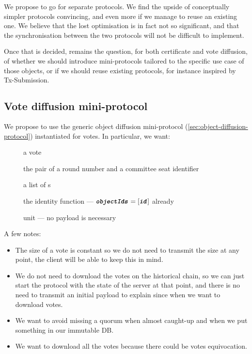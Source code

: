 We propose to go for separate protocols. We find the upside of conceptually
simpler protocols convincing, and even more if we manage to reuse an existing
one. We believe that the lost optimisation is in fact not so significant, and
that the synchronisation between the two protocols will not be difficult to
implement.

Once that is decided, remains the question, for both certificate and vote
diffusion, of whether we should introduce mini-protocols tailored to the
specific use case of those objects, or if we should reuse existing protocols,
for instance inspired by Tx-Submission.


\subsection{Vote diffusion mini-protocol}%
\label{sec:vote-diffusion}

We propose to use the generic object diffusion mini-protocol
(\autoref{sec:object-diffusion-protocol}) instantiated for votes. In particular,
we want:
%
\begin{description}
\item[] a vote
\item[] the pair of a round number and a committee seat
  identifier
\item[] a list of s
\item[] the identity function --- \(\textbf{\texttt{\textit{objectIds}}} =
  [\textbf{\texttt{\textit{id}}}]\) already
\item[] unit --- no payload is necessary
\end{description}

A few notes:

\begin{itemize}
\item The size of a vote is constant so we do not need to transmit the size at
  any point, the client will be able to keep this in mind.

\item We do not need to download the votes on the historical chain, so we can
  just start the protocol with the state of the server at that point, and there
  is no need to transmit an initial payload to explain since when we want to
  download votes.

\item We want to avoid missing a quorum when almost caught-up and when we put
  something in our immutable DB.

\item We want to download all the votes because there could be votes
  equivocation.
\end{itemize}

